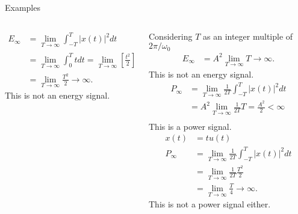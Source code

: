 \begin{frame}{Examples}
\begin{columns}[t]
\begin{column}{0.5\textwidth}
\begin{overprint}
\begin{align*}
                    E_\infty &=  \lim_{T\rightarrow \infty}\int_{-T}^{T}|x(t)|^2dt\\
                    &= \lim_{T\rightarrow \infty}\int_{0}^{T} tdt
                    = \lim_{T\rightarrow \infty} \left[\frac{t^2}{2}\right]_0^T\\
                    &= \lim_{T\rightarrow \infty}\frac{T^2}{2} \rightarrow \infty.
                \end{align*}
                This is not an energy signal.
            \end{overprint}
        \end{column}
        \begin{column}{0.5\textwidth}
            \begin{overprint}
                Considering $T$ as an integer multiple of $2\pi/\omega_0$
                \begin{align*}
                    E_\infty &= A^2\lim_{T\rightarrow \infty}T \rightarrow \infty.
                \end{align*}
                This is not an energy signal.
                \begin{align*}
                    P_\infty &= \lim_{T\rightarrow \infty} \frac{1}{2T}\int_{-T}^{T}|x(t)|^2dt\\
                    &= A^2\lim_{T\rightarrow \infty}\frac{1}{2T}T  = \frac{A^2}{2} < \infty\\
                \end{align*}
                This is a power signal.
                \begin{align*}
                    x(t) &= tu(t)\\
                    P_\infty &=  \lim_{T\rightarrow \infty}\frac{1}{2T}\int_{-T}^{T}|x(t)|^2dt\\
                    &= \lim_{T\rightarrow \infty}\frac{1}{2T}\frac{T^2}{2}\\
                    &= \lim_{T\rightarrow \infty}\frac{T}{4} \rightarrow \infty.
                \end{align*}
                This is not a power signal either.
            \end{overprint}
        \end{column}
    \end{columns}
\end{frame} 
